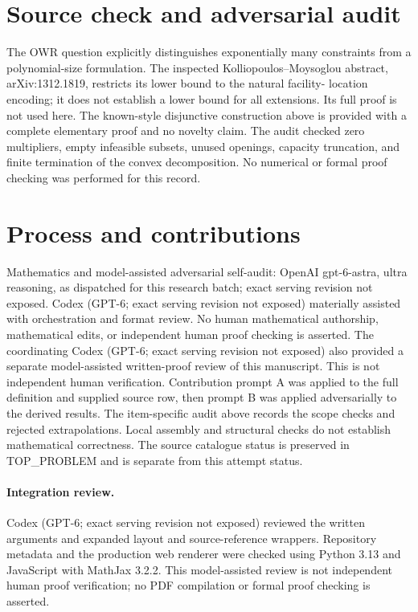 \documentclass[11pt]{article}
\begin{document}
\section{Source check and adversarial audit}
The OWR question explicitly distinguishes exponentially many constraints
from a polynomial-size formulation. The inspected Kolliopoulos--Moysoglou
abstract, arXiv:1312.1819, restricts its lower bound to the natural facility-
location encoding; it does not establish a lower bound for all extensions.
Its full proof is not used here. The known-style disjunctive construction
above is provided with a complete elementary proof and no novelty claim.
The audit checked zero multipliers, empty infeasible subsets, unused openings,
capacity truncation, and finite termination of the convex decomposition.
No numerical or formal proof checking was performed for this record.

\section{Process and contributions}
Mathematics and model-assisted adversarial self-audit: OpenAI gpt-6-astra, ultra reasoning, as dispatched for this research batch; exact serving revision not exposed. Codex (GPT-6; exact serving revision not exposed) materially assisted with orchestration and format review. No human mathematical authorship, mathematical edits, or independent human proof checking is asserted.
The coordinating Codex (GPT-6; exact serving revision not exposed) also provided a separate model-assisted written-proof review of this manuscript. This is not independent human verification.
Contribution prompt A was applied to the full definition and supplied source row, then prompt B was applied adversarially to the derived results. The item-specific audit above records the scope checks and rejected extrapolations. Local assembly and structural checks do not establish mathematical correctness. The source catalogue status is preserved in TOP\_PROBLEM and is separate from this attempt status.
\paragraph{Integration review.} Codex (GPT-6; exact serving revision not exposed) reviewed the written arguments and expanded layout and source-reference wrappers. Repository metadata and the production web renderer were checked using Python 3.13 and JavaScript with MathJax 3.2.2. This model-assisted review is not independent human proof verification; no PDF compilation or formal proof checking is asserted.
\end{document}
